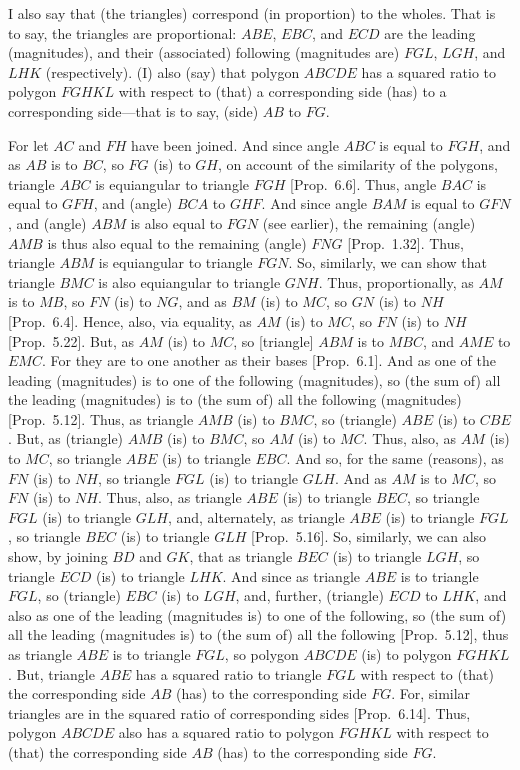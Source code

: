 I also say that (the triangles) correspond (in proportion) to the wholes.
That is to say,  the triangles are proportional:  $ABE$, $EBC$, and
$ECD$ are the leading (magnitudes), and their (associated) following (magnitudes are) 
$FGL$, $LGH$, and $LHK$ (respectively). (I) also (say) that polygon
$ABCDE$ has a squared ratio to polygon $FGHKL$ with respect to
(that) a corresponding side (has) to a corresponding side---that is to
say, (side) $AB$ to $FG$.

For let $AC$ and $FH$ have been joined. And since angle $ABC$ is
equal to $FGH$,  and
as $AB$ is to $BC$, so $FG$ (is) to $GH$, on account of the similarity of the polygons,  triangle $ABC$ is equiangular to triangle
$FGH$ [Prop.~6.6]. Thus, angle $BAC$ is equal 
to $GFH$, and (angle) $BCA$ to $GHF$. And since angle $BAM$ is equal to 
$GFN$, and (angle) $ABM$ is also equal to $FGN$ (see earlier), the remaining (angle) $AMB$ is
thus also equal to the remaining (angle) $FNG$  [Prop.~1.32]. 
Thus, triangle $ABM$ is equiangular to triangle $FGN$. So, similarly, we can
show that triangle $BMC$ is also equiangular to triangle $GNH$. Thus, proportionally,
as $AM$ is to $MB$, so $FN$ (is) to $NG$, and as $BM$ (is) to $MC$, so $GN$ (is) to
$NH$ [Prop.~6.4]. Hence, also, via equality,
as $AM$ (is) to $MC$, so $FN$ (is) to $NH$ 
[Prop.~5.22]. But, as $AM$ (is) to $MC$,
so [triangle] $ABM$ is to $MBC$, and $AME$ to $EMC$. For they are to one another
 as their bases  [Prop.~6.1]. And as one
 of the leading (magnitudes) is to one of the following (magnitudes), so
    (the sum of) all the leading (magnitudes) is to (the sum of) all the following (magnitudes)
[Prop.~5.12]. Thus, as triangle $AMB$
 (is) to $BMC$, so (triangle) $ABE$ (is) to $CBE$. But, as (triangle) $AMB$ (is) to
 $BMC$, so $AM$ (is) to $MC$. Thus, also, as $AM$ (is) to $MC$, so 
triangle $ABE$
 (is) to triangle $EBC$. And so, for the same (reasons), as $FN$ (is) to $NH$,
 so triangle $FGL$  (is) to triangle $GLH$. And as $AM$ is to $MC$, so $FN$ (is) to
 $NH$. Thus, also, as triangle $ABE$ (is) to triangle $BEC$, so triangle $FGL$
 (is) to triangle $GLH$, and, alternately, as triangle $ABE$ (is) to triangle
 $FGL$, so triangle $BEC$ (is) to triangle $GLH$  [Prop.~5.16]. So, similarly, we can also show, by
 joining $BD$ and $GK$, that  as triangle $BEC$ (is) to triangle $LGH$,
 so triangle $ECD$ (is) to triangle $LHK$. And since as triangle $ABE$ is
 to triangle $FGL$, so (triangle) $EBC$ (is) to $LGH$, and, further, (triangle)
 $ECD$ to $LHK$, and also as one of the leading (magnitudes is) to one
 of the following, so (the sum of) all the leading (magnitudes is) to (the sum of) all the
 following [Prop.~5.12], thus as triangle
 $ABE$ is to triangle $FGL$, so polygon $ABCDE$ (is) to polygon
 $FGHKL$. But, triangle $ABE$ has a squared ratio to triangle $FGL$ with
 respect to (that) the corresponding side $AB$ (has) to the corresponding side
 $FG$. For, similar triangles are in the squared ratio of corresponding sides 
[Prop.~6.14]. Thus, polygon
$ABCDE$ also has a squared ratio to polygon $FGHKL$ with respect to
(that) the corresponding side $AB$ (has) to the corresponding side
$FG$.

